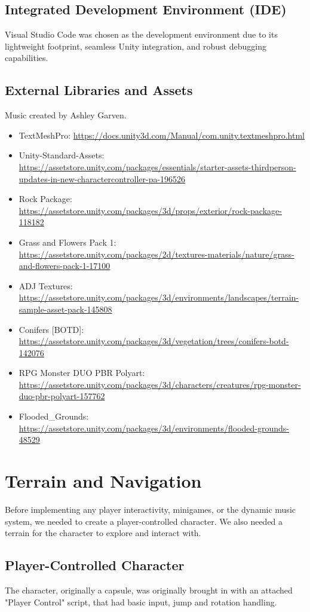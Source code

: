 \documentclass{l4proj}
\begin{document}
\subsection{Integrated Development Environment (IDE)}
Visual Studio Code was chosen as the development environment due to its lightweight footprint, seamless Unity integration, and robust debugging capabilities.

\subsection{External Libraries and Assets}
Music created by Ashley Garven.

\begin{itemize}
    \item TextMeshPro: \url{https://docs.unity3d.com/Manual/com.unity.textmeshpro.html}
    \item Unity-Standard-Assets: \url{https://assetstore.unity.com/packages/essentials/starter-assets-thirdperson-updates-in-new-charactercontroller-pa-196526}
    \item Rock Package: \url{https://assetstore.unity.com/packages/3d/props/exterior/rock-package-118182}
    \item Grass and Flowers Pack 1: \url{https://assetstore.unity.com/packages/2d/textures-materials/nature/grass-and-flowers-pack-1-17100}
    \item ADJ Textures: \url{https://assetstore.unity.com/packages/3d/environments/landscapes/terrain-sample-asset-pack-145808}
    \item Conifers [BOTD]: \url{https://assetstore.unity.com/packages/3d/vegetation/trees/conifers-botd-142076}
    \item RPG Monster DUO PBR Polyart: \url{https://assetstore.unity.com/packages/3d/characters/creatures/rpg-monster-duo-pbr-polyart-157762}
    \item Flooded\_Grounds: \url{https://assetstore.unity.com/packages/3d/environments/flooded-grounds-48529}
\end{itemize}

\section{Terrain and Navigation}
Before implementing any player interactivity, minigames, or the dynamic music system, we needed to create a player-controlled character. We also needed a terrain for the character to explore and interact with.

\subsection{Player-Controlled Character}\label{sec:player_script}
The character, originally a capsule, was originally brought in with an attached "Player Control" script, that had basic input, jump and rotation handling.
\end{document}
